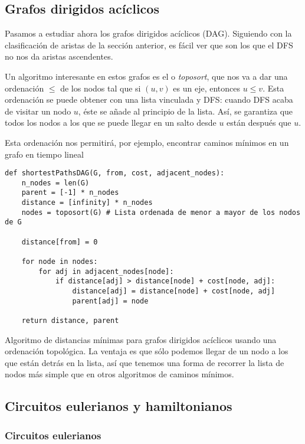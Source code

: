 \documentclass[palatino, nochap]{apuntes}
\begin{document}
\subsection{Grafos dirigidos acíclicos}

Pasamos a estudiar ahora los grafos dirigidos acíclicos (DAG). Siguiendo con la clasificación de aristas de la sección anterior, es fácil ver que son los que el DFS no nos da aristas ascendentes.

Un algoritmo interesante en estos grafos es el  o \textit{toposort}, que nos va a dar una ordenación $≤$ de los nodos tal que si $(u,v)$ es un eje, entonces $u ≤ v$. Esta ordenación se puede obtener con una lista vinculada y DFS: cuando DFS acaba de visitar un nodo $u$, éste se añade al principio de la lista. Así, se garantiza que todos los nodos a los que se puede llegar en un salto desde $u$ están después que $u$.

Esta ordenación nos permitirá, por ejemplo, encontrar caminos mínimos en un grafo en tiempo lineal

\begin{listing}[hbtp]
\begin{verbatim}
def shortestPathsDAG(G, from, cost, adjacent_nodes):
	n_nodes = len(G)
	parent = [-1] * n_nodes
	distance = [infinity] * n_nodes
	nodes = toposort(G) # Lista ordenada de menor a mayor de los nodos de G

	distance[from] = 0

	for node in nodes:
		for adj in adjacent_nodes[node]:
			if distance[adj] > distance[node] + cost[node, adj]:
				distance[adj] = distance[node] + cost[node, adj]
				parent[adj] = node

	return distance, parent
\end{verbatim}
\caption{Algoritmo de distancias mínimas para grafos dirigidos acíclicos usando una ordenación topológica. La ventaja es que sólo podemos llegar de un nodo a los que están detrás en la lista, así que tenemos una forma de recorrer la lista de nodos más simple que en otros algoritmos de caminos mínimos.}
\label{lst:Prim}
\end{listing}

\subsection{Circuitos eulerianos y hamiltonianos}

\subsubsection{Circuitos eulerianos}
\end{document}
